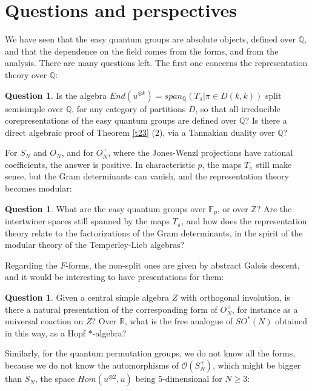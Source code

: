 \documentclass[11pt]{amsart}
\theoremstyle{definition}
\newtheorem{question}[theorem]{Question}
\begin{document}
\section{Questions and perspectives}

We have seen that the easy quantum groups are absolute objects, defined over $\mathbb Q$, and that the dependence on the field comes from the forms, and from the analysis. There are many questions left. The first one concerns the representation theory over $\mathbb Q$:

\begin{question}
Is the algebra $End(u^{\otimes k})=span_{\mathbb Q}(T_\pi|\pi\in D(k,k))$ split semisimple over $\mathbb Q$, for any category of partitions $D$, so that all irreducible corepresentations of the easy quantum groups are defined over $\mathbb Q$? Is there a direct algebraic proof of Theorem \ref{t23} (2), via a Tannakian duality over $\mathbb Q$?
\end{question}

For $S_N$ and $O_N$, and for $O_N^+$, where the Jones-Wenzl projections have rational coefficients, the answer is positive. In characteristic $p$, the maps $T_\pi$ still make sense, but the Gram determinants can vanish, and the representation theory becomes modular:

\begin{question}
What are the easy quantum groups over $\mathbb F_p$, or over $\mathbb Z$? Are the intertwiner spaces still spanned by the maps $T_\pi$, and how does the representation theory relate to the factorizations of the Gram determinants, in the spirit of the modular theory of the Temperley-Lieb algebras?
\end{question}

Regarding the $F$-forms, the non-split ones are given by abstract Galois descent, and it would be interesting to have presentations for them:

\begin{question}
Given a central simple algebra $Z$ with orthogonal involution, is there a natural presentation of the corresponding form of $O_N^+$, for instance as a universal coaction on $Z$? Over $\mathbb R$, what is the free analogue of $SO^*(N)$ obtained in this way, as a Hopf $*$-algebra?
\end{question}

Similarly, for the quantum permutation groups, we do not know all the forms, because we do not know the automorphisms of $\mathcal O(S_N^+)$, which might be bigger than $S_N$, the space $Hom(u^{\otimes2},u)$ being 5-dimensional for $N\geq3$:
\end{document}
